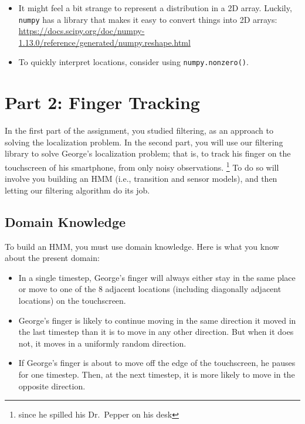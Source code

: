 \documentclass{article}
\begin{document}
\begin{itemize}
\item It might feel a bit strange to represent a distribution in a 2D array.
Luckily, \verb|numpy| has a library that makes it easy to convert things into 2D arrays:
\url{https://docs.scipy.org/doc/numpy-1.13.0/reference/generated/numpy.reshape.html}

\item To quickly interpret locations, consider using \texttt{numpy.nonzero()}.
\end{itemize}
\fi


\section{Part 2: Finger Tracking}

In the first part of the assignment, you
studied filtering, as an approach to solving the localization problem.
In the second part, you will use
our filtering library to solve George's localization problem; that is, to
track his finger on the touchscreen of his smartphone, from only noisy
observations.%
\footnote{since he spilled his Dr.\ Pepper on his desk}
To do so will involve you building an HMM (i.e., transition and sensor
models), and then letting
our filtering algorithm do its job.


\subsection{Domain Knowledge}
To build an HMM, you must use domain knowledge.
Here is what you know about the present domain:

\begin{itemize}
\item In a single timestep, George's finger will always either stay in
  the same place or move to one of the 8 adjacent locations (including
  diagonally adjacent locations) on the touchscreen.

\item George's finger is likely to continue moving in the same
  direction it moved in the last timestep than it is to move in any
  other direction.  But when it does not, it moves in a uniformly
  random direction.

\item If George's finger is about to move off the edge of the
  touchscreen, he pauses for one timestep.  Then, at the next
  timestep, it is more likely to move in the opposite direction.
\end{itemize}
\end{document}
